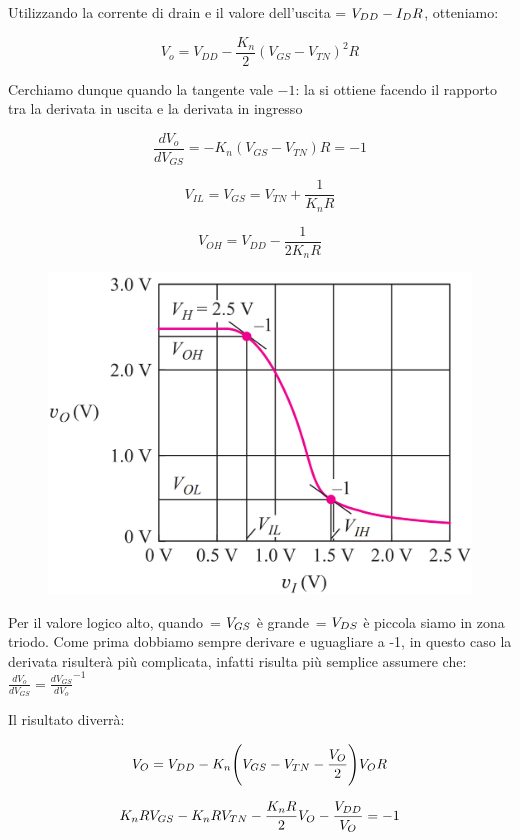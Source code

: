 Utilizzando la corrente di drain e il valore dell'uscita \vo = $V_{DD} - I_DR$, otteniamo:

\begin{equation*}
    V_o = V_{DD} - \frac{K_n}{2}(V_{GS}-V_{TN})^2 R
\end{equation*}

Cerchiamo dunque quando la tangente vale $-1$: la si ottiene facendo il rapporto tra la derivata in uscita e la derivata in ingresso

\begin{equation*}
    \frac{dV_o}{dV_{GS}} = - K_n(V_{GS}-V_{TN})R = -1
\end{equation*}

\begin{equation*}
    V_{IL} = V_{GS} = V_{TN} + \frac{1}{K_nR}
\end{equation*}

\begin{equation*}
    V_{OH} = V_{DD} - \frac{1}{2K_nR}
\end{equation*}


\begin{figure}[htbp]
    \centering
    \includegraphics[width=0.5\linewidth]{img/plot_.png}
    
    
\end{figure}

Per il valore logico alto, quando \vi $\,$= $V_{GS}$ è grande \vo $\,$= $V_{DS}$ è piccola siamo in zona triodo. Come prima dobbiamo sempre derivare e uguagliare a -1, in questo caso la derivata risulterà più complicata, infatti risulta più semplice assumere che: $\frac{dV_o}{dV_{GS}} = \frac{dV_{GS}}{dV_o}^{-1}$

Il risultato diverrà:

\begin{equation*}
    V_O= V_{DD} - K_n\Biggl(V_{GS}- V_{TN} - \frac{V_O}{2}\Biggl)V_O R
\end{equation*}

\begin{equation*}
    K_nRV_{GS} - K_nRV_{TN} - \frac{K_nR}{2}V_O - \frac{V_{DD}}{V_O} = -1
\end{equation*}


